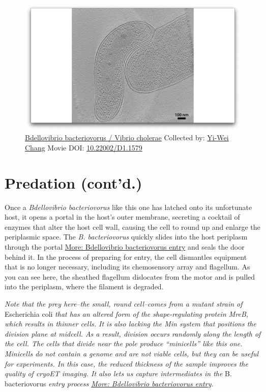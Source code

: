 \documentclass[]{tufte-book}
\begin{document}
\begin{figure}
\includegraphics{movie_stills/9_9} \caption[\protect\hyperlink{tree}{Bdellovibrio bacteriovorus / Vibrio
cholerae} Collected by: \protect\hyperlink{yi-wei_chang}{Yi-Wei Chang}
Movie DOI: \href{https://doi.org/10.22002/D1.1579}{10.22002/D1.1579}]{\protect\hyperlink{tree}{Bdellovibrio bacteriovorus / Vibrio
cholerae} Collected by: \protect\hyperlink{yi-wei_chang}{Yi-Wei Chang}
Movie DOI: \href{https://doi.org/10.22002/D1.1579}{10.22002/D1.1579}}\label{fig:9-9}
\end{figure}

\section{Predation (cont'd.)}\label{predation-contd.}

Once a \emph{Bdellovibrio bacteriovorus} like this one has latched onto
its unfortunate host, it opens a portal in the host's outer membrane,
secreting a cocktail of enzymes that alter the host cell wall, causing
the cell to round up and enlarge the periplasmic space. The \emph{B.
bacteriovorus} quickly slides into the host periplasm through the portal
\protect\hyperlink{Bdellovibrio_bacteriovorus_entry}{More: Bdellovibrio
bacteriovorus entry} and seals the door behind it. In the process of
preparing for entry, the cell dismantles equipment that is no longer
necessary, including its chemosensory array and flagellum. As you can
see here, the sheathed flagellum dislocates from the motor and is pulled
into the periplasm, where the filament is degraded.

\emph{Note that the prey here--the small, round cell--comes from a
mutant strain of} Escherichia coli \emph{that has an altered form of the
shape-regulating protein MreB, which results in thinner cells. It is
also lacking the Min system that positions the division plane at
midcell. As a result, division occurs randomly along the length of the
cell. The cells that divide near the pole produce ``minicells'' like
this one. Minicells do not contain a genome and are not viable cells,
but they can be useful for experiments. In this case, the reduced
thickness of the sample improves the quality of cryoET imaging. It also
lets us capture intermediates in the }B. bacteriovorus \emph{entry
process \protect\hyperlink{Bdellovibrio_bacteriovorus_entry}{More:
Bdellovibrio bacteriovorus entry}.}
\end{document}
